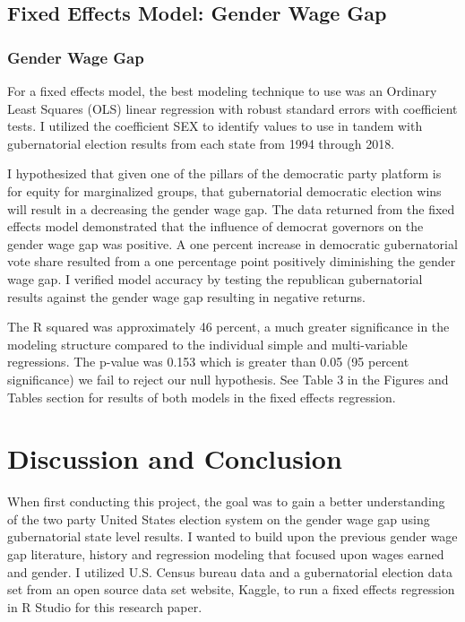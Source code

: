 \documentclass[12pt, English]{article}
\begin{document}
\subsection*{Fixed Effects Model: Gender Wage Gap}
\subsubsection*{Gender Wage Gap}
For a fixed effects model, the best modeling technique to use was an Ordinary Least Squares (OLS) linear regression with robust standard errors with coefficient tests. I utilized the coefficient SEX to identify values to use in tandem with gubernatorial election results from each state from 1994 through 2018. 

I hypothesized that given one of the pillars of the democratic party platform is for equity for marginalized groups, that gubernatorial democratic election wins will result in a decreasing the gender wage gap. The data returned from the fixed effects model demonstrated that the influence of democrat governors on the gender wage gap was positive. A one percent increase in democratic gubernatorial vote share resulted from a one percentage point positively diminishing the gender wage gap. I verified model accuracy by testing the republican gubernatorial results against the gender wage gap resulting in negative returns. 

The R squared was approximately 46 percent, a much greater significance in the modeling structure compared to the individual simple and multi-variable regressions. The p-value was 0.153 which is greater than 0.05 (95 percent significance) we fail to reject our null hypothesis. See Table 3 in the Figures and Tables section for results of both models in the fixed effects regression. 


\newpage
\section{Discussion and Conclusion}
When first conducting this project, the goal was to gain a better understanding of the two party United States election system on the gender wage gap using  gubernatorial state level results. I wanted to build upon the previous gender wage gap literature, history and regression modeling that focused upon wages earned and gender. I utilized U.S. Census bureau data and a gubernatorial election data set from an open source data set website, Kaggle, to run a fixed effects regression in R Studio for this research paper. 
\end{document}
